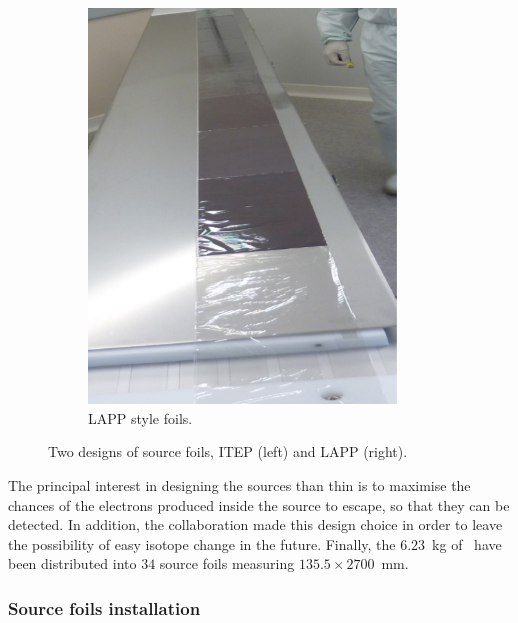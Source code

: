 \begin{figure}[h!]
\begin{subfigure}[t]{0.49\textwidth}
\centering
\includegraphics[width=0.9\textwidth]{SNdemonstrator/fig_SNdemonstrator/LAPP_source_foils.png}
\captionsetup{justification=centering}
\caption{LAPP style foils.
\label{subfig:LAPP_foils}}
\end{subfigure}
\caption{Two designs of source foils, ITEP (left) and LAPP (right).
\label{fig:foils_design}}
\end{figure}
The principal interest in designing the sources than thin is to maximise the chances of the electrons produced inside the source to escape, so that they can be detected.
In addition, the collaboration made this design choice in order to leave the possibility of easy isotope change in the future.
Finally, the $6.23$~kg of \Se\ have been distributed into $34$ source foils measuring $135.5\times2700$~mm.

\subsubsection*{Source foils installation}

